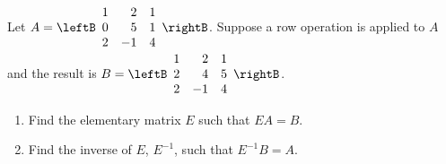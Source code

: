 \begin{enumialphparenastyle}
\begin{ex} 
Let $A = \leftB \begin{array}{rrr}
1 & 2 & 1  \\
0 & 5 & 1 \\
2 & -1 & 4
\end{array}\rightB$. Suppose a row operation is applied to $A$ and the result is $B = \leftB \begin{array}{rrr}
1 & 2 & 1\\
2 & 4 & 5 \\
2 & -1 & 4  
\end{array}\rightB$. 
\begin{enumerate}
\item Find the elementary matrix $E$ such that $EA = B$. 

\item Find the inverse of $E$, $E^{-1}$, such that $E^{-1}B = A$.
\end{enumerate}
\end{ex}

\end{enumialphparenastyle}